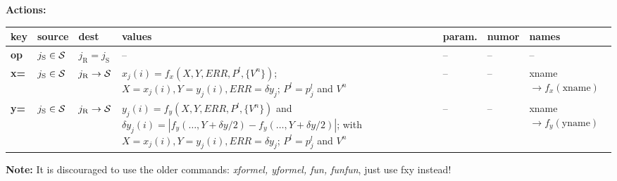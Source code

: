 \documentclass[11pt,fleqn]{book} %
\begin{document}
\vskip 1cm
\noindent
{\bf Actions:}
\vskip 0.5cm

\footnotesize
\noindent
\begin{tabular}{ | l | l | l | p{5cm} | l | l | l | }


\hline
  key         &
  source      & 
  dest        & 
  values      & 
  param.      & 
  numor       &
  names        \\ 
\hline\hline %
  {\bf op}                                  &
  ${j_\mathrm{S} \in \cal{S}}$              & 
  ${j_\mathrm{R}=j_\mathrm{S} }$            & 
  --         & 
  --         & 
  --         & 
  --        \\ 
\hline
  {\bf x=}  &
  ${j_\mathrm{S} \in \cal{S}}$             &
  ${j_\mathrm{R} \rightarrow \cal{S}}$     & 
  ${x_j(i) = f_x(X,Y,ERR,{P^l},\{V^n\})}$;
   $X=x_j(i), Y=y_j(i), ERR=\delta y_j$;
   $P^l=p^l_j$ and $V^n$                   & 
  -- & 
  -- &
  xname ${\rightarrow f_x(\text{xname})} $\\ 
 \hline
  {\bf y=}  &
  ${j_\mathrm{S} \in \cal{S}}$             &
  ${j_\mathrm{R} \rightarrow \cal{S}}$     & 
  ${y_j(i) = f_y(X,Y,ERR,{P^l},\{V^n\})}$ \hfill and \hfill
  $\delta y_j(i) = |f_y(\dots, Y+\delta y/2)-f_y(\dots, Y+\delta y/2)|$; \hfill
  with
  $X=x_j(i), Y=y_j(i), ERR=\delta y_j$;
  $P^l=p^l_j$ and $V^n$       &            
  -- & 
  -- &
  xname ${\rightarrow f_y(\text{yname})} $\\ 
 \hline
\end{tabular}

\normalsize
%
%
\vskip 1cm
\noindent
{\bf Note:} It is discouraged to use the older commands: \emph{xformel, yformel, fun, funfun}, just use fxy instead!

\end{document}
